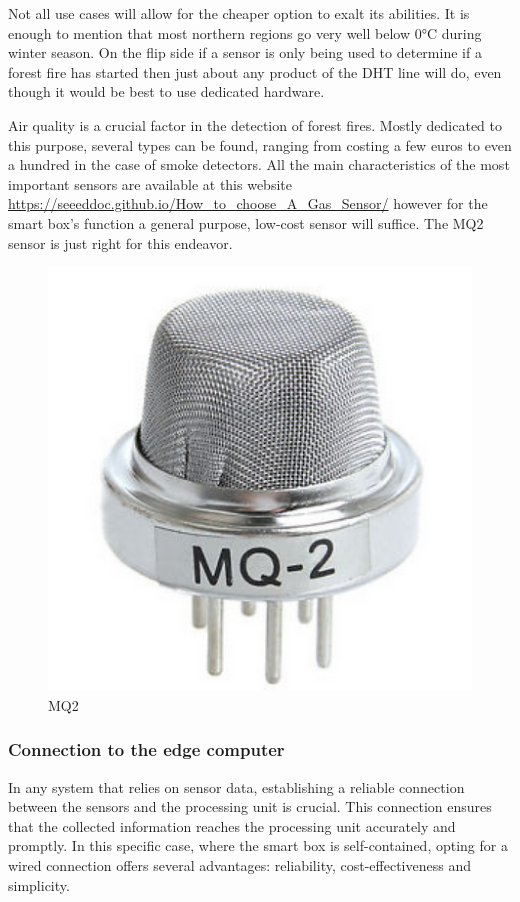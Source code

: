 \documentclass[11pt]{article}
\begin{document}
Not all use cases will allow for the cheaper option to exalt its abilities. It is enough to mention that most northern regions go very well below 0°C during winter season. On the flip side if a sensor is only being used to determine if a forest fire has started then just about any product of the DHT line will do, even though it would be best to use dedicated hardware. \par
\vspace{0.5 cm}
Air quality is a crucial factor in the detection of forest fires. Mostly dedicated to this purpose, several types can be found, ranging from costing a few euros to even a hundred in the case of smoke detectors. All the main characteristics of the most important sensors are available at this website \url{https://seeeddoc.github.io/How_to_choose_A_Gas_Sensor/} \newline
however for the smart box's function a general purpose, low-cost sensor will suffice. The MQ2 sensor is just right for this endeavor.\par
\vspace{0.5 cm}
\begin{figure}[h]
    \centering
    \includegraphics[scale = 0.2]{MQ2.png}
    \caption{MQ2}
    \label{fig:MQ2}
\end{figure}

\subsubsection{Connection to the edge computer}
In any system that relies on sensor data, establishing a reliable connection between the sensors and the processing unit is crucial. This connection ensures that the collected information reaches the processing unit accurately and promptly. In this specific case, where the smart box is self-contained, opting for a wired connection offers several advantages: reliability, cost-effectiveness and simplicity.
\end{document}
